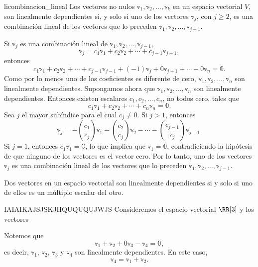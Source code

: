 \begin{theorem}{}{licombinacion_lineal}
    Los vectores no nulos $\mathbb{v}_1, \mathbb{v}_2, \dots, \mathbb{v}_k$ en un espacio vectorial $V$, son linealmente dependientes si, y solo si uno de los vectores $\mathbb{v}_j$, con $j \geq 2$, es una combinación lineal de los vectores que lo preceden $\mathbb{v}_1, \mathbb{v}_2, \dots, \mathbb{v}_{j-1}$.

    \tcblower
    \demostracion Si $\mathbb{v}_j$ es una combinación lineal de $\mathbb{v}_1, \mathbb{v}_2, \dots, \mathbb{v}_{j-1}$,
    $$\mathbb{v}_j = c_1 \mathbb{v}_1 + c_2 \mathbb{v}_2 + \cdots + c_{j-1} \mathbb{v}_{j-1},$$
    entonces
    $$c_1 \mathbb{v}_1 + c_2 \mathbb{v}_2 + \cdots + c_{j-1} \mathbb{v}_{j-1} + (-1) \mathbb{v}_j + 0 \mathbb{v}_{j+1} + \cdots + 0 \mathbb{v}_n = \mathbb{0}.$$
    Como por lo menos uno de los coeficientes es diferente de cero, $\mathbb{v}_1, \mathbb{v}_2, \dots, \mathbb{v}_n$ son linealmente dependientes. Supongamos ahora que $\mathbb{v}_1, \mathbb{v}_2, \dots, \mathbb{v}_n$ son linealmente dependientes. Entonces existen escalares $c_1, c_2, \dots, c_n$, no todos cero, tales que
    $$c_1 \mathbb{v}_1 + c_2 \mathbb{v}_2 + \cdots + c_n \mathbb{v}_n = \mathbb{0}.$$
    Sea $j$ el mayor subíndice para el cual $c_j \neq 0$. Si $j > 1$, entonces
    $$\mathbb{v}_j = - \left( \frac{c_1}{c_j} \right) \mathbb{v}_1 - \left( \frac{c_2}{c_j} \right) \mathbb{v}_2 - \cdots - \left( \frac{c_{j-1}}{c_j} \right) \mathbb{v}_{j-1}.$$
    Si $j = 1$, entonces $c_1 \mathbb{v}_1 = \mathbb{0}$, lo que implica que $\mathbb{v}_1 = \mathbb{0}$, contradiciendo la hipótesis de que ninguno de los vectores es el vector cero. Por lo tanto, uno de los vectores $\mathbb{v}_j$ es una combinación lineal de los vectores que lo preceden $\mathbb{v}_1, \mathbb{v}_2, \dots, \mathbb{v}_{j-1}$.
\end{theorem}

\begin{corollary}{}{}
    Dos vectores en un espacio vectorial son linealmente dependientes si y solo si uno de ellos es un múltiplo escalar del otro.
\end{corollary}

\begin{examplebox}{}{IAIAIKAJSJSKJHQUQUQUJWJS}
    Consideremos el espacio vectorial $\RR[3]$ y los vectores
    \begin{matrizn}
    \end{matrizn}
    Notemos que
    $$\mathbb{v}_1 + \mathbb{v}_2 + 0\mathbb{v}_3 - \mathbb{v}_4 = \mathbb{0},$$
    es decir, $\mathbb{v}_1$, $\mathbb{v}_2$, $\mathbb{v}_3$ y $\mathbb{v}_4$ son linealmente dependientes. En este caso,
    $$\mathbb{v}_4 = \mathbb{v}_1 + \mathbb{v}_2.$$
\end{examplebox}

